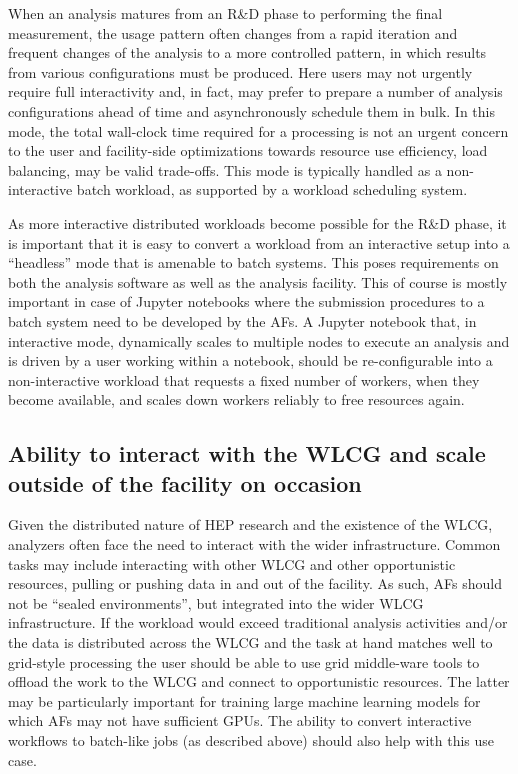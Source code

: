 When an analysis matures from an R\&D phase to performing the final measurement, the usage pattern often changes from a rapid iteration and frequent changes of the analysis to a more controlled pattern, in which results from various configurations must be produced. Here users may not urgently require full interactivity and, in fact, may prefer to prepare a number of analysis configurations ahead of time and asynchronously schedule them in bulk. In this mode, the total wall-clock time required for a processing is not an urgent concern to the user and facility-side optimizations towards resource use efficiency, load balancing, may be valid trade-offs. This mode is typically handled as a non-interactive batch workload, as supported by a workload scheduling system.

As more interactive distributed workloads become possible for the R\&D phase, it is important that it is easy to convert a workload from an interactive setup into a “headless” mode that is amenable to batch systems. This poses requirements on both the analysis software as well as the analysis facility. This of course is mostly important in case of Jupyter notebooks where the submission procedures to a batch system need to be developed by the AFs. A Jupyter notebook that, in interactive mode, dynamically scales to multiple nodes to execute an analysis and is driven by a user working within a notebook, should be re-configurable into a non-interactive workload that requests a fixed number of workers, when they become available, and scales down workers reliably to free resources again. 


\subsection*{Ability to interact with the WLCG and scale outside of the facility on occasion}

Given the distributed nature of HEP research and the existence of the WLCG, analyzers often face the need to interact with the wider infrastructure. Common tasks may include interacting with other WLCG and other opportunistic resources, pulling or pushing data in and out of the facility. As such, AFs should not be “sealed environments”, but integrated into the wider WLCG infrastructure.  If the workload would exceed traditional analysis activities and/or the data is distributed across the WLCG and the task at hand matches well to grid-style processing the user should be able to use grid middle-ware tools to offload the work to the WLCG and connect to opportunistic resources. The latter may be particularly important for training large machine learning models for which AFs may not have sufficient GPUs. The ability to convert interactive workflows to batch-like jobs (as described above) should also help with this use case.

